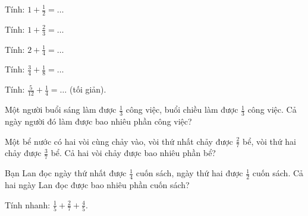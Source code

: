 \begin{ex}
Tính: $1 + \frac{1}{2} = \dots$
\end{ex}

\begin{ex}
Tính: $1 + \frac{2}{3} = \dots$
\end{ex}

\begin{ex}
Tính: $2 + \frac{1}{4} = \dots$
\end{ex}

\begin{ex}
Tính: $\frac{3}{4} + \frac{1}{8} = \dots$
\end{ex}

\begin{ex}
Tính: $\frac{5}{12} + \frac{1}{4} = \dots$ (tối giản).
\end{ex}

\begin{ex}
Một người buổi sáng làm được $\frac{1}{3}$ công việc, buổi chiều làm được $\frac{1}{3}$ công việc. Cả ngày người đó làm được bao nhiêu phần công việc?
\end{ex}

\begin{ex}
Một bể nước có hai vòi cùng chảy vào, vòi thứ nhất chảy được $\frac{2}{7}$ bể, vòi thứ hai chảy được $\frac{3}{7}$ bể. Cả hai vòi chảy được bao nhiêu phần bể?
\end{ex}

\begin{ex}
Bạn Lan đọc ngày thứ nhất được $\frac{1}{4}$ cuốn sách, ngày thứ hai được $\frac{1}{2}$ cuốn sách. Cả hai ngày Lan đọc được bao nhiêu phần cuốn sách?
\end{ex}

\begin{ex}
Tính nhanh: $\frac{1}{5} + \frac{2}{7} + \frac{4}{5}$.
\end{ex}

